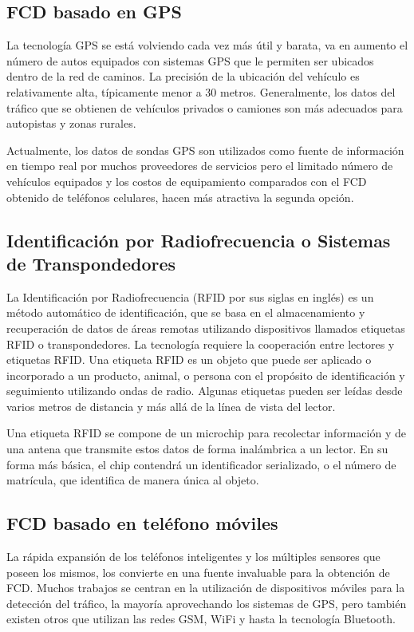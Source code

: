 \subsection{FCD basado en GPS}

La tecnología GPS se está volviendo cada vez más útil y barata, va en aumento el número de autos equipados con sistemas GPS que le permiten ser ubicados dentro de la red de caminos. La precisión de la ubicación del vehículo es relativamente alta, típicamente menor a 30 metros. Generalmente, los datos del tráfico que se obtienen de vehículos privados o camiones son más adecuados para autopistas y zonas rurales.

Actualmente, los datos de sondas GPS son utilizados como fuente de información en tiempo real por muchos proveedores de servicios pero el limitado número de vehículos equipados y los costos de equipamiento comparados con el FCD obtenido de teléfonos celulares, hacen más atractiva la segunda opción.

\subsection{Identificación por Radiofrecuencia o Sistemas de Transpondedores}

La Identificación por Radiofrecuencia (RFID por sus siglas en inglés)  es un método automático de identificación, que se basa en el almacenamiento y recuperación de datos de áreas remotas utilizando dispositivos llamados etiquetas RFID o transpondedores. La tecnología requiere la cooperación entre lectores y etiquetas RFID. Una etiqueta RFID es un objeto que puede ser aplicado o incorporado a un producto, animal, o persona con el propósito de identificación y seguimiento utilizando ondas de radio. Algunas etiquetas pueden ser leídas desde varios metros de distancia y más allá de la línea de vista del lector.

Una etiqueta RFID se compone de un microchip para recolectar información y de una antena que transmite estos datos de forma inalámbrica a un lector. En su forma más básica, el chip contendrá un identificador serializado, o el número de matrícula, que identifica de manera única al objeto.

\subsection{FCD basado en teléfono móviles}

La rápida expansión de los teléfonos inteligentes y los múltiples sensores que poseen los mismos, los convierte en una fuente invaluable para la obtención de FCD. Muchos trabajos se centran en la utilización de dispositivos móviles para la detección del tráfico, la mayoría aprovechando los sistemas de GPS, pero también existen otros que utilizan las redes GSM, WiFi y hasta la tecnología Bluetooth.

